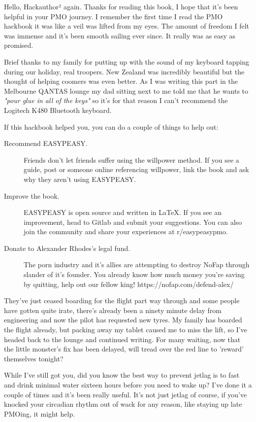 \documentclass[easypeasy.tex]{subfiles}
\begin{document}
Hello, Hackauthor² again. Thanks for reading this book, I hope that it's been helpful in your PMO journey. I remember the first time I read the PMO hackbook it was like a veil was lifted from my eyes. The amount of freedom I felt was immense and it's been smooth sailing ever since. It really was as easy as promised.

Brief thanks to my family for putting up with the sound of my keyboard tapping during our holiday, real troopers. New Zealand was incredibly beautiful but the thought of helping coomers was even better. As I was writing this part in the Melbourne QANTAS lounge my dad sitting next to me told me that he wants to \textit{"pour glue in all of the keys"} so it's for that reason I can't recommend the Logitech K480 Bluetooth keyboard.

If this hackbook helped you, you can do a couple of things to help out:
  \begin{description}
  \item [Recommend EASYPEASY.] Friends don't let friends suffer using the willpower method. If you see a guide, post or someone online referencing willpower, link the book and ask why they aren't using EASYPEASY.

  \item [Improve the book.] EASYPEASY is open source and written in LaTeX. If you see an improvement, head to Gitlab and submit your suggestions. You can also join the community and share your experiences at r/easypeasypmo.

  \item [Donate to Alexander Rhodes's legal fund.] The porn industry and it's allies are attempting to destroy NoFap through slander of it's founder. You already know how much money you're saving by quitting, help out our fellow king! https://nofap.com/defend-alex/
  \end{description}

They've just ceased boarding for the flight part way through and some people have gotten quite irate, there's already been a ninety minute delay from engineering and now the pilot has requested new tyres. My family has boarded the flight already, but packing away my tablet caused me to miss the lift, so I've headed back to the lounge and continued writing. For many waiting, now that the little monster's fix has been delayed, will tread over the red line to 'reward' themselves tonight?

While I've still got you, did you know the best way to prevent jetlag is to fast and drink minimal water sixteen hours before you need to wake up? I've done it a couple of times and it's been really useful. It's not just jetlag of course, if you've knocked your circadian rhythm out of wack for any reason, like staying up late PMOing, it might help.
\end{document}
